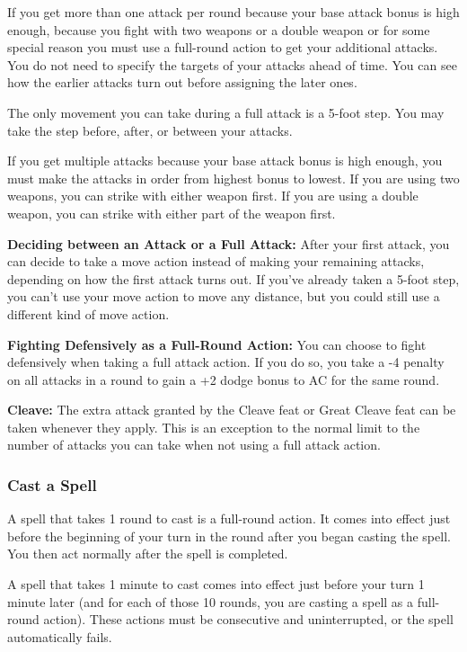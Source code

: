 \documentclass{article}
\begin{document}
If you get more than one attack per round because your base attack bonus is high 
enough, because you fight with two weapons or a double weapon or for some special 
reason you must use a full-round action to get your additional attacks. You do 
not need to specify the targets of your attacks ahead of time. You can see how 
the earlier attacks turn out before assigning the later ones.

The only movement you can take during a full attack is a 5-foot step. You may take 
the step before, after, or between your attacks.

If you get multiple attacks because your base attack bonus is high enough, you 
must make the attacks in order from highest bonus to lowest. If you are using two 
weapons, you can strike with either weapon first. If you are using a double weapon, 
you can strike with either part of the weapon first.

\textbf{Deciding between an Attack or a Full Attack:} After your first attack, 
you can decide to take a move action instead of making your remaining attacks, 
depending on how the first attack turns out. If you've already taken a 5-foot step, 
you can't use your move action to move any distance, but you could still use a 
different kind of move action.

\textbf{Fighting Defensively as a Full-Round Action:} You can choose to fight defensively 
when taking a full attack action. If you do so, you take a -4 penalty on all attacks 
in a round to gain a +2 dodge bonus to AC for the same round.

\textbf{Cleave:} The extra attack granted by the Cleave feat or Great Cleave feat 
can be taken whenever they apply. This is an exception to the normal limit to the 
number of attacks you can take when not using a full attack action.

\vspace{12pt}
\subsubsection*{\textbf{Cast a Spell}}

A spell that takes 1 round to cast is a full-round action. It comes into effect 
just before the beginning of your turn in the round after you began casting the 
spell. You then act normally after the spell is completed.

A spell that takes 1 minute to cast comes into effect just before your turn 1 minute 
later (and for each of those 10 rounds, you are casting a spell as a full-round 
action). These actions must be consecutive and uninterrupted, or the spell automatically 
fails.
\end{document}
